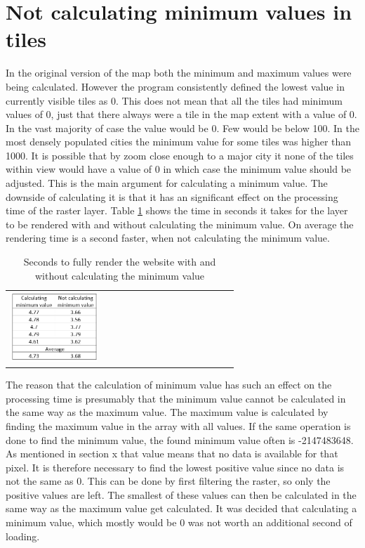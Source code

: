\section{Not calculating minimum values in tiles} \label{WhyNoMin}

In the original version of the map both the minimum and maximum values were being calculated. However the program consistently defined the lowest value in currently visible tiles as 0.
This does not mean that all the tiles had minimum values of 0, just that there always were a tile in the map extent with a value of 0. In the vast majority of case the value would be 0. Few would be below 100. In the most densely populated cities the minimum value for some tiles was higher than 1000. 
It is possible that by zoom close enough to a major city it none of the tiles within view would have a value of 0 in which case the minimum value should be adjusted.
This is the main argument for calculating a minimum value. The downside of calculating it is that it has an significant effect on the processing time of the raster layer. Table \ref{tabMinimum} shows the time in seconds it takes for the layer to be rendered with and without calculating the minimum value. On average the rendering time is a second faster, when not calculating the minimum value.

\begin{table}[htbp]
	\centering
	\begin{tabular}{l}
		\includegraphics[width=0.4\textwidth]{Pictures/tabMinimum}
	\end{tabular}
	\caption{Seconds to fully render the website with and without calculating the minimum value}
	\label{tabMinimum}
\end{table}

The reason that the calculation of minimum value has such an effect on the processing time is presumably that the minimum value cannot be calculated in the same way as the maximum value. 
The maximum value is calculated by finding the maximum value in the array with all values. 
If the same operation is done to find the minimum value, the found minimum value often is -2147483648. As mentioned in section x that value means that no data is available for that pixel. 
It is therefore necessary to find the lowest positive value since no data is not the same as 0. This can be done by first filtering the raster, so only the positive values are left. The smallest of these values can then be calculated in the same way as the maximum value get calculated. 
It was decided that calculating a minimum value, which mostly would be 0 was not worth an additional second of loading. 
